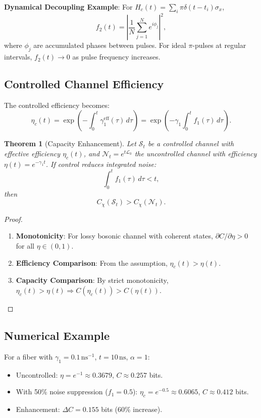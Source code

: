 \documentclass[12pt]{article}
\newtheorem{theorem}{Theorem}[section]
\newcommand{\SJ}{\mathcal{S}}
\newcommand{\Lgen}{\mathcal{L}}
\begin{document}
\textbf{Dynamical Decoupling Example}: For $H_c(t) = \sum_i \pi \delta(t-t_i) \sigma_x$,
\begin{equation}
    f_2(t) = \left| \frac{1}{N} \sum_{j=1}^N e^{i\phi_j} \right|^2,
\end{equation}
where $\phi_j$ are accumulated phases between pulses. For ideal $\pi$-pulses at regular intervals, $f_2(t) \to 0$ as pulse frequency increases.

\subsection{Controlled Channel Efficiency}
The controlled efficiency becomes:
\begin{equation}
    \eta_c(t) = \exp\left( -\int_0^t \gamma_1^{\text{eff}}(\tau) \, d\tau \right) = \exp\left( -\gamma_1 \int_0^t f_1(\tau) \, d\tau \right).
\end{equation}

\begin{theorem}[Capacity Enhancement]
    Let $\SJ_t$ be a controlled channel with effective efficiency $\eta_c(t)$, and $\mathcal{N}_t = e^{t\Lgen_0}$ the uncontrolled channel with efficiency $\eta(t) = e^{-\gamma_1 t}$. If control reduces integrated noise:
    \begin{equation}
        \int_0^t f_1(\tau) \, d\tau < t,
    \end{equation}
    then
    \begin{equation}
        C_\chi(\SJ_t) > C_\chi(\mathcal{N}_t).
    \end{equation}
\end{theorem}
\begin{proof}
    \begin{enumerate}
        \item \textbf{Monotonicity}: For lossy bosonic channel with coherent states, $\partial C/\partial \eta > 0$ for all $\eta \in (0,1)$.
        \item \textbf{Efficiency Comparison}: From the assumption, $\eta_c(t) > \eta(t)$.
        \item \textbf{Capacity Comparison}: By strict monotonicity, $\eta_c(t) > \eta(t) \Rightarrow C(\eta_c(t)) > C(\eta(t))$.
    \end{enumerate}
\end{proof}

\subsection{Numerical Example}
For a fiber with $\gamma_1 = 0.1\, \mathrm{ns}^{-1}$, $t = 10\, \mathrm{ns}$, $\alpha = 1$:
\begin{itemize}
    \item Uncontrolled: $\eta = e^{-1} \approx 0.3679$, $C \approx 0.257$ bits.
    \item With 50\% noise suppression ($f_1 = 0.5$): $\eta_c = e^{-0.5} \approx 0.6065$, $C \approx 0.412$ bits.
    \item Enhancement: $\Delta C = 0.155$ bits (60\% increase).
\end{itemize}
\end{document}
